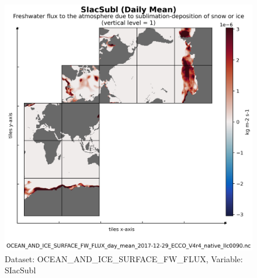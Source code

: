 \begin{figure}[H]
\centering
\includegraphics[scale=0.55]{../images/plots/v4r4/native_plots/Ocean_and_Sea-Ice_Surface_Freshwater_Fluxes/SIacSubl.png}
\caption{Dataset: OCEAN\_AND\_ICE\_SURFACE\_FW\_FLUX, Variable: SIacSubl}
\label{tab:table-OCEAN_AND_ICE_SURFACE_FW_FLUX_SIacSubl-Plot}
\end{figure}
\newpage
\pagebreak
